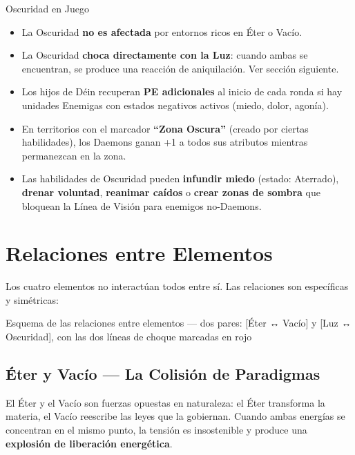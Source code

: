 \begin{reglaespecial}{Oscuridad en Juego}
\begin{itemize}
    \item La Oscuridad \textbf{no es afectada} por entornos ricos en Éter o Vacío.
    \item La Oscuridad \textbf{choca directamente con la Luz}: cuando ambas se encuentran, se produce una reacción de aniquilación. Ver sección siguiente.
    \item Los hijos de Déin recuperan \textbf{PE adicionales} al inicio de cada ronda si hay unidades Enemigas con estados negativos activos (miedo, dolor, agonía).
    \item En territorios con el marcador \textbf{``Zona Oscura''} (creado por ciertas habilidades), los Daemons ganan +1 a todos sus atributos mientras permanezcan en la zona.
    \item Las habilidades de Oscuridad pueden \textbf{infundir miedo} (estado: Aterrado), \textbf{drenar voluntad}, \textbf{reanimar caídos} o \textbf{crear zonas de sombra} que bloquean la Línea de Visión para enemigos no-Daemons.
\end{itemize}
\end{reglaespecial}

\section{Relaciones entre Elementos}

Los cuatro elementos no interactúan todos entre sí. Las relaciones son específicas y simétricas:

\begin{imagebox}{Esquema de las relaciones entre elementos — dos pares: [Éter ↔ Vacío] y [Luz ↔ Oscuridad], con las dos líneas de choque marcadas en rojo}
    \vspace{3cm}
\end{imagebox}

\subsection*{Éter y Vacío — La Colisión de Paradigmas}

El Éter y el Vacío son fuerzas opuestas en naturaleza: el Éter transforma la materia, el Vacío reescribe las leyes que la gobiernan. Cuando ambas energías se concentran en el mismo punto, la tensión es insostenible y produce una \textbf{explosión de liberación energética}.


